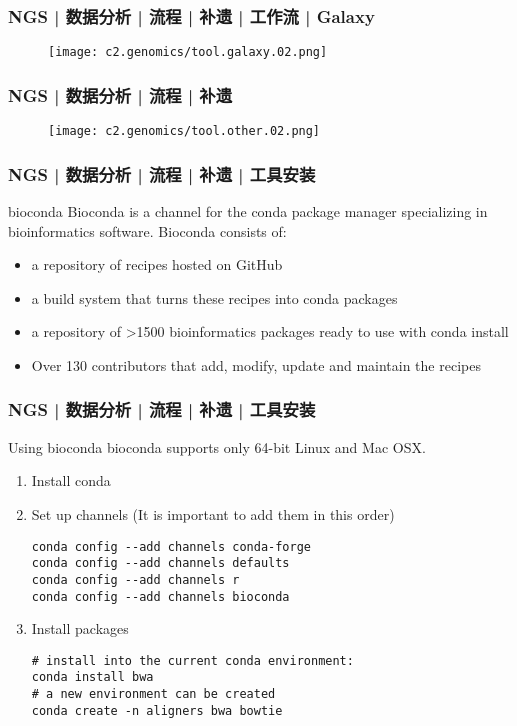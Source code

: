 \begin{frame}
  \frametitle{NGS | 数据分析 | 流程 | 补遗 | 工作流 | Galaxy}
  \begin{figure}
    \centering
    \texttt{[image: c2.genomics/tool.galaxy.02.png]}
  \end{figure}
\end{frame}

\begin{frame}
  \frametitle{NGS | 数据分析 | 流程 | 补遗}
  \begin{figure}
    \centering
    \texttt{[image: c2.genomics/tool.other.02.png]}
  \end{figure}
\end{frame}

\begin{frame}
  \frametitle{NGS | 数据分析 | 流程 | 补遗 | 工具安装}
  \begin{block}{\alert{bioconda}}
    Bioconda is a channel for the conda package manager specializing in bioinformatics software. Bioconda consists of:
    \begin{itemize}
      \item a repository of recipes hosted on GitHub
      \item a build system that turns these recipes into conda packages
      \item a repository of >1500 bioinformatics packages ready to use with conda install
      \item Over 130 contributors that add, modify, update and maintain the recipes
    \end{itemize}
  \end{block}
\end{frame}

\begin{frame}[fragile]
  \frametitle{NGS | 数据分析 | 流程 | 补遗 | 工具安装}
  \begin{block}{Using bioconda}
    bioconda supports only 64-bit Linux and Mac OSX.
    \begin{enumerate}
      \item Install conda
      \item Set up channels (It is important to add them in this order)
\vspace{-0.5em}
\begin{lstlisting}
conda config --add channels conda-forge
conda config --add channels defaults
conda config --add channels r
conda config --add channels bioconda
\end{lstlisting}
\vspace{-0.8em}
      \item Install packages
\vspace{-0.5em}
\begin{lstlisting}
# install into the current conda environment:
conda install bwa
# a new environment can be created
conda create -n aligners bwa bowtie
\end{lstlisting}
    \end{enumerate}
  \end{block}
\end{frame}

